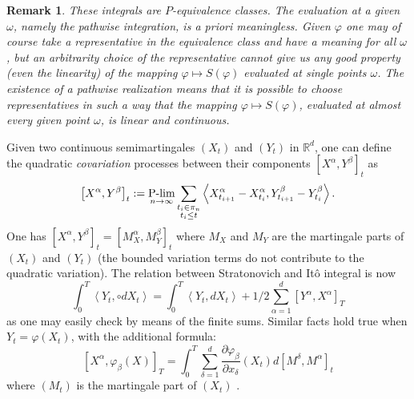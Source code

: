 \documentclass{article}
\newtheorem{remark}[theorem]{Remark}
\begin{document}
\begin{remark}
These integrals are $P$-equivalence classes. The evaluation at a given $%
\omega $, namely the pathwise integration, is a priori meaningless. Given $%
\varphi $ one may of course take a representative in the equivalence class
and have a meaning for all $\omega $, but an arbitrarity choice of the
representative cannot give us any good property (even the linearity) of the
mapping $\varphi \mapsto S\left( \varphi \right) $ evaluated at single
points $\omega $. The existence of a pathwise realization means that it is
possible to choose representatives in such a way that the mapping $\varphi
\mapsto S\left( \varphi \right) $, evaluated at almost every given point $%
\omega $, is linear and  continuous.
\end{remark}

\bigskip Given two continuous semimartingales $\left( X_{t}\right) $ and $%
\left( Y_{t}\right) $ in $\mathbb{R}^{d}$, one can define the quadratic 
\textit{covariation} processes between their components $\left[ X^{\alpha
},Y^{\beta }\right] _{t}$ as 
\begin{equation*}
\left[ X^{\alpha },Y^{\beta }\right] _{t} := \operatornamewithlimits{P-lim}_{n\rightarrow \infty }\sum 
_{\substack{ t_{i}\in \pi _{n}  \\ t_{i}\leq t}}\left\langle
X_{t_{i+1}}^{\alpha }-X_{t_{i}}^{\alpha },Y_{t_{i+1}}^{\beta
}-Y_{t_{i}}^{\beta }\right\rangle .
\end{equation*}
One has $[ X^{\alpha },Y^{\beta }] _{t}=[ M_{X}^{\alpha
},M_{Y}^{\beta }] _{t}$ where $M_{X}$ and $M_{Y}$ are the martingale
parts of $\left( X_{t}\right) $ and $\left( Y_{t}\right) $ (the bounded
variation terms do not contribute to the quadratic variation). The relation
between Stratonovich and It\^{o} integral is now 
\begin{equation*}
\int_{0}^{T}\left\langle Y_{t},\circ dX_{t}\right\rangle
=\int_{0}^{T}\left\langle Y_{t},dX_{t}\right\rangle +1/2\sum_{\alpha
=1}^{d}\left[ Y^{\alpha },X^{\alpha }\right] _{T}
\end{equation*}
as one may easily check by means of the finite sums. Similar facts hold true
when $Y_{t}=\varphi \left( X_{t}\right) $, with the additional formula: 
\begin{equation*}
\left[ X^{\alpha },\varphi _{\beta }\left( X\right) \right]
_{T}=\int_{0}^{T}\sum_{\delta=1}^{d}\frac{\partial \varphi _{\beta }}{\partial
x_{\delta}}\left( X_{t}\right) d\left[ M^{\delta},M^{\alpha }\right] _{t}
\end{equation*}
where $\left( M_{t}\right) $ is the martingale part of $\left( X_{t}\right) $%
.
\end{document}
